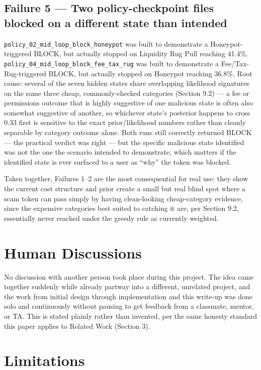 \documentclass[11pt]{article}
\begin{document}
\subsection{Failure 5 --- Two policy-checkpoint files blocked on a different state than intended}

\texttt{policy\_02\_mid\_loop\_block\_honeypot} was built to demonstrate a Honeypot-triggered BLOCK, but actually stopped on Liquidity Rug Pull reaching 41.4\%. \texttt{policy\_04\_mid\_loop\_block\_fee\_tax\_rug} was built to demonstrate a Fee/Tax-Rug-triggered BLOCK, but actually stopped on Honeypot reaching 36.8\%. Root cause: several of the seven hidden states share overlapping likelihood signatures on the same three cheap, commonly-checked categories (Section 9.2) --- a fee or permissions outcome that is highly suggestive of one malicious state is often also somewhat suggestive of another, so whichever state's posterior happens to cross 0.33 first is sensitive to the exact prior/likelihood numbers rather than cleanly separable by category outcome alone. Both runs still correctly returned BLOCK --- the practical verdict was right --- but the specific malicious state identified was not the one the scenario intended to demonstrate, which matters if the identified state is ever surfaced to a user as ``why'' the token was blocked.

Taken together, Failures 1--2 are the most consequential for real use: they show the current cost structure and prior create a small but real blind spot where a scam token can pass simply by having clean-looking cheap-category evidence, since the expensive categories best suited to catching it are, per Section 9.2, essentially never reached under the greedy rule as currently weighted.

\section{Human Discussions}

No discussion with another person took place during this project. The idea came together suddenly while already partway into a different, unrelated project, and the work from initial design through implementation and this write-up was done solo and continuously without pausing to get feedback from a classmate, mentor, or TA. This is stated plainly rather than invented, per the same honesty standard this paper applies to Related Work (Section 3).

\section{Limitations}
\end{document}
